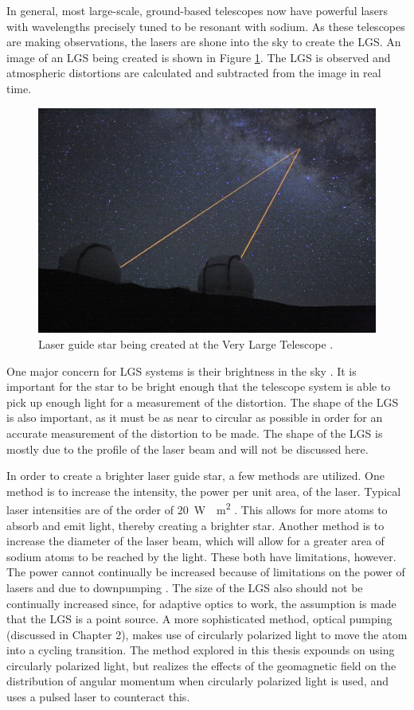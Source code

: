 In general, most large-scale, ground-based telescopes now have powerful lasers with wavelengths precisely tuned to be resonant with sodium. As these telescopes are making observations, the lasers are shone into the sky to create the LGS. An image of an LGS being created is shown in Figure \ref{fig:LGSatESO}. The LGS is observed and atmospheric distortions are calculated and subtracted from the image in real time.

\begin{figure}[hb!]
  \centering
  \includegraphics[width = .8\textwidth]{Images/LGSatESO.jpg}
  \caption{Laser guide star being created at the Very Large Telescope \protect\cite{VLT}.}
  \label{fig:LGSatESO}
\end{figure}

One major concern for LGS systems is their brightness in the sky \cite{Wizinowich2006}. It is important for the star to be bright enough that the telescope system is able to pick up enough light for a measurement of the distortion. The shape of the LGS is also important, as it must be as near to circular as possible in order for an accurate measurement of the distortion to be made. The shape of the LGS is mostly due to the profile of the laser beam \cite{Holzlohner2012} and will not be discussed here.

In order to create a brighter laser guide star, a few methods are utilized. One method is to increase the intensity, the power per unit area, of the laser. Typical laser intensities are of the order of \SI{20}{W \per \meter \squared} \cite{Kane2014}. This allows for more atoms to absorb and emit light, thereby creating a brighter star. Another method is to increase the diameter of the laser beam, which will allow for a greater area of sodium atoms to be reached by the light. These both have limitations, however. The power cannot continually be increased because of limitations on the power of lasers and due to downpumping \cite{Kane2014}. The size of the LGS also should not be continually increased since, for adaptive optics to work, the assumption is made that the LGS is a point source. A more sophisticated method, optical pumping (discussed in Chapter 2), makes use of circularly polarized light to move the atom into a cycling transition. The method explored in this thesis expounds on using circularly polarized light, but realizes the effects of the geomagnetic field on the distribution of angular momentum when circularly polarized light is used, and uses a pulsed laser to counteract this.


